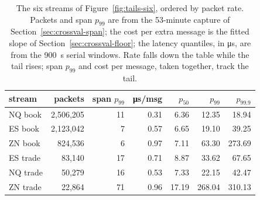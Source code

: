 \documentclass[11pt]{article}
\begin{document}
\begin{table}[H]
\centering
\small
\begin{tabular}{@{}lrrrrrr@{}}
\toprule
stream & packets & span $p_{99}$ & \si{\micro\second}/msg & $p_{50}$ & $p_{99}$ & $p_{99.9}$ \\
\midrule
NQ book  & 2{,}506{,}205 &  11 & 0.31 &  6.36 &  12.35 &  18.94 \\
ES book  & 2{,}123{,}042 &   7 & 0.57 &  6.65 &  19.10 &  39.25 \\
ZN book  &   824{,}536   &   6 & 0.97 &  7.11 &  63.30 & 273.69 \\
ES trade &    83{,}140   &  17 & 0.71 &  8.87 &  33.62 &  67.65 \\
NQ trade &    50{,}279   &  16 & 0.53 &  7.33 &  22.15 &  42.47 \\
ZN trade &    22{,}864   &  71 & 0.96 & 17.19 & 268.04 & 310.13 \\
\bottomrule
\end{tabular}
\caption{The six streams of Figure~\ref{fig:tails-six}, ordered by packet rate.
Packets and span $p_{99}$ are from the 53-minute capture of
Section~\ref{sec:crossval-span}; the cost per extra message is the fitted slope of
Section~\ref{sec:crossval-floor}; the latency quantiles, in \si{\micro\second}, are
from the \SI{900}{\second} serial windows. Rate falls down the table while the tail
rises; span $p_{99}$ and cost per message, taken together, track the tail.}
\label{tab:tails-six}
\end{table}
\end{document}
